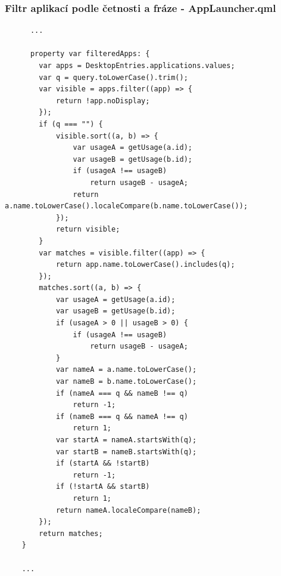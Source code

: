 \documentclass[12pt,a4paper]{article}
\begin{document}
\clearpage
\subsubsection{Filtr aplikací podle četnosti a fráze - AppLauncher.qml}
\label{AppLauncher.qml 0}
\begin{lstlisting}
      ...

      property var filteredApps: {
        var apps = DesktopEntries.applications.values;
        var q = query.toLowerCase().trim();
        var visible = apps.filter((app) => {
            return !app.noDisplay;
        });
        if (q === "") {
            visible.sort((a, b) => {
                var usageA = getUsage(a.id);
                var usageB = getUsage(b.id);
                if (usageA !== usageB)
                    return usageB - usageA;
                return a.name.toLowerCase().localeCompare(b.name.toLowerCase());
            });
            return visible;
        }
        var matches = visible.filter((app) => {
            return app.name.toLowerCase().includes(q);
        });
        matches.sort((a, b) => {
            var usageA = getUsage(a.id);
            var usageB = getUsage(b.id);
            if (usageA > 0 || usageB > 0) {
                if (usageA !== usageB)
                    return usageB - usageA;
            }
            var nameA = a.name.toLowerCase();
            var nameB = b.name.toLowerCase();
            if (nameA === q && nameB !== q)
                return -1;
            if (nameB === q && nameA !== q)
                return 1;
            var startA = nameA.startsWith(q);
            var startB = nameB.startsWith(q);
            if (startA && !startB)
                return -1;
            if (!startA && startB)
                return 1;
            return nameA.localeCompare(nameB);
        });
        return matches;
    }

    ...
\end{lstlisting}

\clearpage
\end{document}
